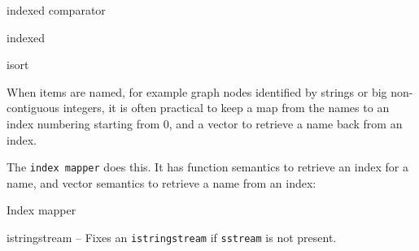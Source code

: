 \categorycontents{}


\begin{algorithm}{indexed comparator}
\end{algorithm}

\begin{algorithm}{indexed}
\end{algorithm}

\begin{algorithm}{isort}
\end{algorithm}

When items are named, for example graph nodes identified by strings or big
non-contiguous integers, it is often practical to keep a map from the
names to an index numbering starting from 0, and a vector to retrieve a name
back from an index.

The {\tt index mapper} does this.
It has function semantics to retrieve an index for a name,
and vector semantics to retrieve a name from an index:
\begin{algorithm}{Index mapper}
\end{algorithm}

\begin{algorithm}{istringstream}
-- Fixes an {\tt istringstream} if {\tt sstream} is not present.
\end{algorithm}

\begin{sourceslandscape}
\end{sourceslandscape}
